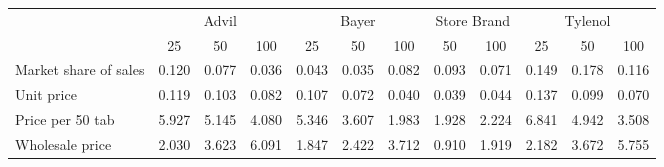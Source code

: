 {
\def\sym#1{\ifmmode^{#1}\else\(^{#1}\)\fi}
\begin{tabular}{l*{11}{c}}
\hline\hline
                    &\multicolumn{3}{c}{Advil}             &\multicolumn{3}{c}{Bayer}             &\multicolumn{2}{c}{Store Brand}&\multicolumn{3}{c}{Tylenol}           \\\cmidrule(lr){2-4}\cmidrule(lr){5-7}\cmidrule(lr){8-9}\cmidrule(lr){10-12}
                    &\multicolumn{1}{c}{25}&\multicolumn{1}{c}{50}&\multicolumn{1}{c}{100}&\multicolumn{1}{c}{25}&\multicolumn{1}{c}{50}&\multicolumn{1}{c}{100}&\multicolumn{1}{c}{50}&\multicolumn{1}{c}{100}&\multicolumn{1}{c}{25}&\multicolumn{1}{c}{50}&\multicolumn{1}{c}{100}\\
\hline
Market share of sales&       0.120&       0.077&       0.036&       0.043&       0.035&       0.082&       0.093&       0.071&       0.149&       0.178&       0.116\\
Unit price          &       0.119&       0.103&       0.082&       0.107&       0.072&       0.040&       0.039&       0.044&       0.137&       0.099&       0.070\\
Price per 50 tab    &       5.927&       5.145&       4.080&       5.346&       3.607&       1.983&       1.928&       2.224&       6.841&       4.942&       3.508\\
Wholesale price     &       2.030&       3.623&       6.091&       1.847&       2.422&       3.712&       0.910&       1.919&       2.182&       3.672&       5.755\\
\hline\hline
\end{tabular}
}
